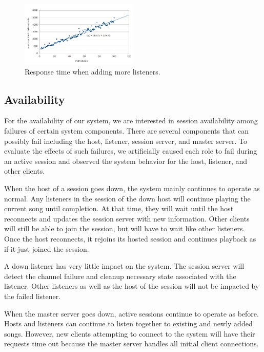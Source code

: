 \begin{figure}[h]
	\centering
	\includegraphics[width=0.5\textwidth]{add_listeners_response_time.png}
	\caption{Response time when adding more listeners.}
	\label{fig:addListenersResponseTime}
\end{figure}

\subsection{Availability}

For the availability of our system, we are interested in session
availability among failures of certain system components. There are
several components that can possibly fail including the host,
listener, session server, and master server. To evaluate the
effects of such failures, we artificially caused each role to fail
during an active session and observed the system behavior for the
host, listener, and other clients.

When the host of a session goes down, the system mainly continues
to operate as normal. Any listeners in the session of the down host
will continue playing the current song until completion. At that
time, they will wait until the host reconnects and updates the
session server with new information. Other clients will still be
able to join the session, but will have to wait like other
listeners. Once the host reconnects, it rejoins its hosted session
and continues playback as if it just joined the session.

A down listener has very little impact on the system. The session
server will detect the channel failure and cleanup necessary state
associated with the listener. Other listeners as well as the host
of the session will not be impacted by the failed listener.

When the master server goes down, active sessions continue to
operate as before. Hosts and listeners can continue to listen
together to existing and newly added songs. However, new clients
attempting to connect to the system will have their requests time
out because the master server handles all initial client connections.

